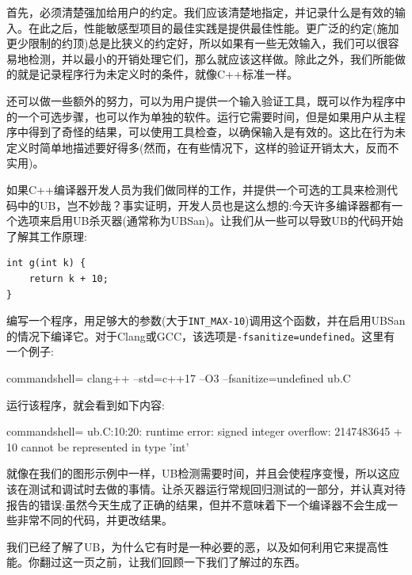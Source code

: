 首先，必须清楚强加给用户的约定。我们应该清楚地指定，并记录什么是有效的输入。在此之后，性能敏感型项目的最佳实践是提供最佳性能。更广泛的约定(施加更少限制的约顶)总是比狭义的约定好，所以如果有一些无效输入，我们可以很容易地检测，并以最小的开销处理它们，那么就应该这样做。除此之外，我们所能做的就是记录程序行为未定义时的条件，就像C++标准一样。 

还可以做一些额外的努力，可以为用户提供一个输入验证工具，既可以作为程序中的一个可选步骤，也可以作为单独的软件。运行它需要时间，但是如果用户从主程序中得到了奇怪的结果，可以使用工具检查，以确保输入是有效的。这比在行为未定义时简单地描述要好得多(然而，在有些情况下，这样的验证开销太大，反而不实用)。

如果C++编译器开发人员为我们做同样的工作，并提供一个可选的工具来检测代码中的UB，岂不妙哉？事实证明，开发人员也是这么想的:今天许多编译器都有一个选项来启用UB杀灭器(通常称为UBSan)。让我们从一些可以导致UB的代码开始了解其工作原理:

\begin{lstlisting}[style=styleCXX]
int g(int k) {
	return k + 10;
}

\end{lstlisting}

编写一个程序，用足够大的参数(大于\texttt{INT\_MAX-10})调用这个函数，并在启用UBSan的情况下编译它。对于Clang或GCC，该选项是\texttt{-fsanitize=undefined}。这里有一个例子:

\begin{tcblisting}{commandshell={}}
clang++ --std=c++17 –O3 –fsanitize=undefined ub.C
\end{tcblisting}

运行该程序，就会看到如下内容:

\begin{tcblisting}{commandshell={}}
ub.C:10:20: runtime error: signed integer overflow: 
        2147483645 + 10 cannot be represented in type 'int'
\end{tcblisting}

就像在我们的图形示例中一样，UB检测需要时间，并且会使程序变慢，所以这应该在测试和调试时去做的事情。让杀灭器运行常规回归测试的一部分，并认真对待报告的错误:虽然今天生成了正确的结果，但并不意味着下一个编译器不会生成一些非常不同的代码，并更改结果。

我们已经了解了UB，为什么它有时是一种必要的恶，以及如何利用它来提高性能。你翻过这一页之前，让我们回顾一下我们了解过的东西。

























